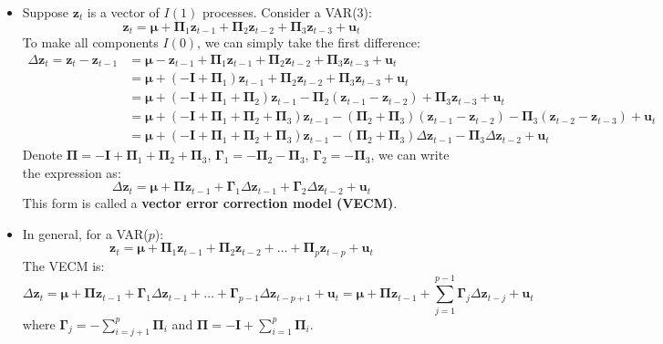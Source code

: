 \documentclass[notitlepage]{article}
\begin{document}
\begin{itemize}
    \item Suppose \(\mathbf{z}_t\) is a vector of \(I(1)\) processes.  Consider a VAR(3):
    \[
    \mathbf{z}_t = \boldsymbol{\mu} + \boldsymbol{\Pi}_1 \mathbf{z}_{t-1} + \boldsymbol{\Pi}_2 \mathbf{z}_{t-2} + \boldsymbol{\Pi}_3 \mathbf{z}_{t-3} + \mathbf{u}_t
    \]
    To make all components \(I(0)\), we can simply take the first difference:
    \begin{align*}
        \Delta \mathbf{z}_t =\mathbf{z}_t - \mathbf{z}_{t-1} 
        &= \boldsymbol{\mu} - \mathbf{z}_{t-1} + \boldsymbol{\Pi}_1 \mathbf{z}_{t-1} + \boldsymbol{\Pi}_2 \mathbf{z}_{t-2} + \boldsymbol{\Pi}_3 \mathbf{z}_{t-3} + \mathbf{u}_t \\
        &= \boldsymbol{\mu} + (- \mathbf{I}+\boldsymbol{\Pi}_1) \mathbf{z}_{t-1} + \boldsymbol{\Pi}_2 \mathbf{z}_{t-2} + \boldsymbol{\Pi}_3 \mathbf{z}_{t-3} + \mathbf{u}_t \\
        &= \boldsymbol{\mu} + (- \mathbf{I}+\boldsymbol{\Pi}_1+\boldsymbol{\Pi}_2) \mathbf{z}_{t-1} - \boldsymbol{\Pi}_2 (\mathbf{z}_{t-1}-\mathbf{z}_{t-2}) + \boldsymbol{\Pi}_3 \mathbf{z}_{t-3} + \mathbf{u}_t \\
        &= \boldsymbol{\mu} + (- \mathbf{I}+\boldsymbol{\Pi}_1+\boldsymbol{\Pi}_2+\boldsymbol{\Pi}_3) \mathbf{z}_{t-1} - (\boldsymbol{\Pi}_2+\boldsymbol{\Pi}_3) (\mathbf{z}_{t-1}-\mathbf{z}_{t-2}) - \boldsymbol{\Pi}_3 (\mathbf{z}_{t-2} - \mathbf{z}_{t-3}) + \mathbf{u}_t \\
        &= \boldsymbol{\mu} + (- \mathbf{I}+\boldsymbol{\Pi}_1+\boldsymbol{\Pi}_2+\boldsymbol{\Pi}_3) \mathbf{z}_{t-1} - (\boldsymbol{\Pi}_2+\boldsymbol{\Pi}_3) \Delta\mathbf{z}_{t-1} - \boldsymbol{\Pi}_3 \Delta\mathbf{z}_{t-2} + \mathbf{u}_t
    \end{align*}
    Denote \(\boldsymbol{\Pi}=- \mathbf{I}+\boldsymbol{\Pi}_1+\boldsymbol{\Pi}_2+\boldsymbol{\Pi}_3\), \(\boldsymbol{\Gamma}_1=-\boldsymbol{\Pi}_2-\boldsymbol{\Pi}_3\), \(\boldsymbol{\Gamma}_2=-\boldsymbol{\Pi}_3\), we can write the expression as:
    \[
    \Delta \mathbf{z}_t  = \boldsymbol{\mu} + \boldsymbol{\Pi} \mathbf{z}_{t-1} + \boldsymbol{\Gamma}_1 \Delta\mathbf{z}_{t-1} + \boldsymbol{\Gamma}_2 \Delta\mathbf{z}_{t-2} + \mathbf{u}_t
    \]
    This form is called a \textbf{vector error correction model (VECM)}.
    
    \item In general, for a VAR(\(p\)):
    \[
    \mathbf{z}_t = \boldsymbol{\mu} + \boldsymbol{\Pi}_1 \mathbf{z}_{t-1} + \boldsymbol{\Pi}_2 \mathbf{z}_{t-2} + \dots + \boldsymbol{\Pi}_p \mathbf{z}_{t-p} + \mathbf{u}_t
    \]
    The VECM is:
    \[
        \Delta \mathbf{z}_t
        = \boldsymbol\mu + \boldsymbol{\Pi}\mathbf{z}_{t-1} + \boldsymbol{\Gamma}_1 \Delta \mathbf{z}_{t-1} + \dots + \boldsymbol{\Gamma}_{p-1} \Delta \mathbf{z}_{t-p+1} + \mathbf{u}_t
        = \boldsymbol\mu + \boldsymbol{\Pi}\mathbf{z}_{t-1} + \sum_{j=1}^{p-1}\boldsymbol{\Gamma}_{j} \Delta \mathbf{z}_{t-j} + \mathbf{u}_t
    \]
    where \(\boldsymbol{\Gamma}_{j} = -\sum_{i=j+1}^p  \boldsymbol\Pi_i\) and \(\boldsymbol{\Pi} = -\mathbf{I}+\sum_{i=1}^p  \boldsymbol\Pi_i\).


\end{itemize}
\end{document}
